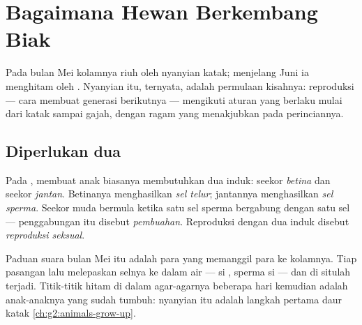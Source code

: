 \chapter{Bagaimana Hewan Berkembang Biak}\label{ch:g4:animal-reproduction}

Pada bulan Mei kolamnya riuh oleh nyanyian katak; menjelang Juni ia
menghitam oleh . Nyanyian itu, ternyata, adalah permulaan
kisahnya: reproduksi --- cara  membuat generasi berikutnya ---
mengikuti aturan yang berlaku mulai dari katak sampai gajah, dengan
ragam yang menakjubkan pada perinciannya.

\section{Diperlukan dua}

\begin{definition}\label{def:g4:animal-reproduction:sexual}
Pada , membuat anak biasanya membutuhkan dua induk: seekor
\emph{betina} dan seekor \emph{jantan}.
Betinanya menghasilkan \emph{sel telur}; jantannya
menghasilkan \emph{sel sperma}. Seekor  muda
bermula ketika satu sel sperma bergabung dengan satu sel  ---
penggabungan itu disebut \emph{pembuahan}. Reproduksi
dengan dua induk disebut \emph{reproduksi
seksual}.
\end{definition}

\begin{example}\label{ex:g4:animal-reproduction:song}
Paduan suara bulan Mei itu adalah para  yang memanggil para
 ke kolamnya. Tiap pasangan lalu melepaskan selnya ke dalam air
---  si , sperma si  --- dan di situlah 
terjadi. Titik-titik hitam di dalam agar-agarnya beberapa hari
kemudian adalah anak-anaknya yang sudah tumbuh: nyanyian itu adalah
langkah pertama daur katak \cref{ch:g2:animals-grow-up}.
\end{example}

